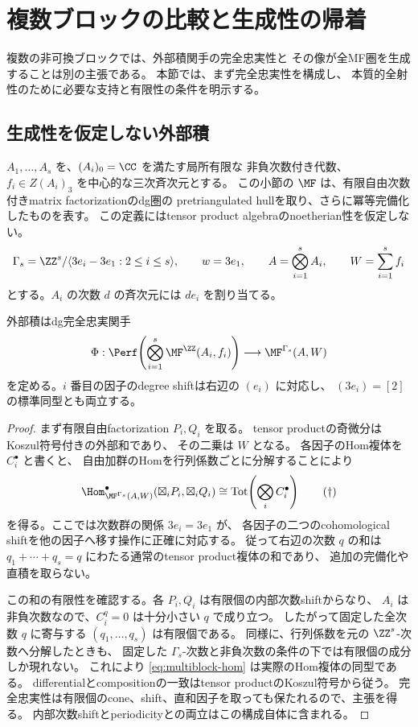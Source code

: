 \section{複数ブロックの比較と生成性の帰着}\label{sec:multiblock}

複数の非可換ブロックでは、外部積関手の完全忠実性と
その像が全MF圏を生成することは別の主張である。
本節では、まず完全忠実性を構成し、
本質的全射性のために必要な支持と有限性の条件を明示する。

\subsection{生成性を仮定しない外部積}

\(A_1,\ldots,A_s\) を、\((A_i)_0=\CC\) を満たす局所有限な
非負次数付き代数、\(f_i\in Z(A_i)_3\) を中心的な三次斉次元とする。
この小節の \(\MF\) は、有限自由次数付きmatrix factorizationのdg圏の
pretriangulated hullを取り、さらに冪等完備化したものを表す。
この定義にはtensor product algebraのnoetherian性を仮定しない。
\[
 \Gamma_s=\ZZ^s/\langle3e_i-3e_1:2\le i\le s\rangle,
 \qquad w=3e_1,
 \qquad A=\bigotimes_{i=1}^s A_i,
 \qquad W=\sum_{i=1}^s f_i
\]
とする。\(A_i\) の次数 \(d\) の斉次元には \(de_i\) を割り当てる。

\begin{lemma}[外部積の完全忠実性]\label{lem:multiblock-ff}
 外部積はdg完全忠実関手
 \[
 \Phi:\Perf\!\left(\bigotimes_{i=1}^s\MF^{\ZZ}(A_i,f_i)\right)
 \longrightarrow\MF^{\Gamma_s}(A,W)
 \]
 を定める。\(i\) 番目の因子のdegree shiftは右辺の \((e_i)\) に対応し、
 \((3e_i)=[2]\) の標準同型とも両立する。
\end{lemma}
\begin{proof}
 まず有限自由factorization \(P_i,Q_i\) を取る。
 tensor productの奇微分はKoszul符号付きの外部和であり、
 その二乗は \(W\) となる。
 各因子のHom複体を \(C_i^\bullet\) と書くと、
 自由加群のHomを行列係数ごとに分解することにより
 \[
 \Hom_{\MF^{\Gamma_s}(A,W)}^\bullet
       (\boxtimes_iP_i,\boxtimes_iQ_i)
 \cong
 \operatorname{Tot}\!\left(\bigotimes_i C_i^\bullet\right)
 \tag{\(\dagger\)}\label{eq:multiblock-hom}
 \]
 を得る。ここでは次数群の関係 \(3e_i=3e_1\) が、
 各因子の二つのcohomological shiftを他の因子へ移す操作に正確に対応する。
 従って右辺の次数 \(q\) の和は
 \(q_1+\cdots+q_s=q\) にわたる通常のtensor product複体の和であり、
 追加の完備化や直積を取らない。

 この和の有限性を確認する。各 \(P_i,Q_i\) は有限個の内部次数shiftからなり、
 \(A_i\) は非負次数なので、\(C_i^q=0\) は十分小さい \(q\) で成り立つ。
 したがって固定した全次数 \(q\) に寄与する \((q_1,\ldots,q_s)\) は有限個である。
 同様に、行列係数を元の \(\ZZ^s\)-次数へ分解したときも、
 固定した \(\Gamma_s\)-次数と非負次数の条件の下では有限個の成分しか現れない。
 これにより \eqref{eq:multiblock-hom} は実際のHom複体の同型である。
 differentialとcompositionの一致はtensor productのKoszul符号から従う。
 完全忠実性は有限個のcone、shift、直和因子を取っても保たれるので、主張を得る。
 内部次数shiftとperiodicityとの両立はこの構成自体に含まれる。
\end{proof}

